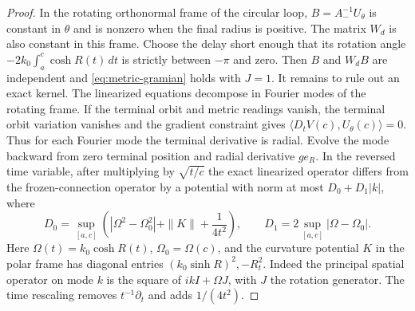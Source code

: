 \begin{proof}
In the rotating orthonormal frame of the circular
loop, $B=A_-^{-1}U_\theta$ is constant in $\theta$
and is nonzero when the final radius is positive.
The matrix $W_d$ is also constant in this frame.
Choose the delay short enough that its rotation
angle $-2k_0\int_a^c\cosh R(t)\,dt$ is strictly
between $-\pi$ and zero.
Then $B$ and $W_d B$ are independent and
\eqref{eq:metric-gramian} holds with $J=1$.
It remains to rule out an exact kernel. The linearized
equations decompose in Fourier modes of the
rotating frame. If the terminal orbit and
metric readings vanish, the terminal orbit variation
vanishes and the gradient constraint gives
$\langle D_t V(c),U_\theta(c)\rangle=0$.
Thus for each Fourier mode the terminal derivative
is radial. Evolve the mode backward from zero
terminal position and radial derivative $g e_R$.
In the reversed time variable, after multiplying by
$\sqrt{t/c}$ the exact linearized operator differs
from the frozen-connection operator by a potential
with norm at most $D_0+D_1|k|$, where
\[
 D_0=\sup_{[a,c]}\left(
 |\Omega^2-\Omega_0^2|+\|K\|+\frac{1}{4t^2}\right),
 \qquad
 D_1=2\sup_{[a,c]}|\Omega-\Omega_0|.
\]
Here $\Omega(t)=k_0\cosh R(t)$, $\Omega_0=\Omega(c)$,
and the curvature potential $K$ in the polar
frame has diagonal entries $(k_0\sinh R)^2,-R_t^2$.
Indeed the principal spatial operator on mode $k$
is the square of $ikI+\Omega J$, with $J$ the
rotation generator. The time rescaling removes
$t^{-1}\partial_t$ and adds $1/(4t^2)$.


\end{proof}
